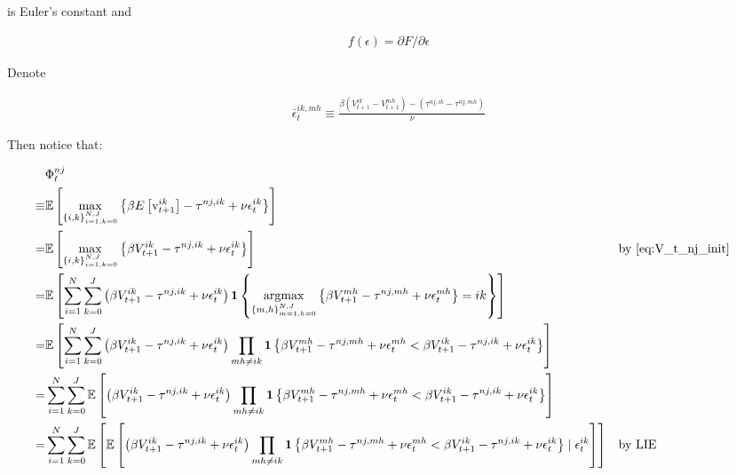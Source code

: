 \documentclass[10pt]{article}
\begin{document}
is Euler's constant and 

\begin{align}
    f(\epsilon)=\partial F / \partial \epsilon
\end{align}

Denote

\begin{align}
    \bar{\epsilon}_t^{i k, m h} \equiv \frac{\beta\left(V_{t+1}^{i k}-V_{t+1}^{m h}\right)-\left(\tau^{n j, i k}-\tau^{n j, m h}\right)}{\nu} \label{eq:bar_epsilon_exp}
\end{align}

Then notice that:

\begin{align}
    &\Phi_t^{n j} \\
    \equiv &\mathbb{E}\left[\max _{\{i, k\}_{i=1, k=0}^{N, J}}\left\{\beta E\left[\mathrm{v}_{t+1}^{i k}\right]-\tau^{n j, i k}+\nu \epsilon_t^{i k}\right\}\right] \\
    = &\mathbb{E}\left[\max _{\{i, k\}_{i=1, k=0}^{N, J}} \left\{ \beta V_{t+1}^{i k}-\tau^{n j, i k}+\nu \epsilon_t^{i k} \right\}\right] && \text{by \eqref{eq:V_t_nj_init}} \\
    = &\mathbb{E}\left[ \sum_{i = 1}^N \sum_{k = 0}^J \left(\beta V_{t+1}^{i k}-\tau^{n j, i k}+\nu \epsilon_t^{i k}\right) \mathbf{1}\left\{ \underset{{\{m, h\}_{m=1, h=0}^{N, J}}}{\text{argmax}} \left\{ \beta V_{t+1}^{m h}-\tau^{n j, m h}+\nu \epsilon_t^{m h} \right\} = i k \right\} \right] \\
    = &\mathbb{E}\left[ \sum_{i = 1}^N \sum_{k = 0}^J \left(\beta V_{t+1}^{i k}-\tau^{n j, i k}+\nu \epsilon_t^{i k}\right) \prod_{m h \neq i k} \mathbf{1}\left\{ \beta V_{t+1}^{m h}-\tau^{n j, m h}+\nu \epsilon_t^{m h} < \beta V_{t+1}^{i k}-\tau^{n j, i k}+\nu \epsilon_t^{i k} \right\} \right] \\
    = &\sum_{i=1}^N \sum_{k=0}^J \mathbb{E}\left[ \left(\beta V_{t+1}^{i k}-\tau^{n j, i k}+\nu \epsilon_t^{i k}\right) \prod_{m h \neq i k} \mathbf{1}\left\{ \beta V_{t+1}^{m h}-\tau^{n j, m h}+\nu \epsilon_t^{m h} < \beta V_{t+1}^{i k}-\tau^{n j, i k}+\nu \epsilon_t^{i k} \right\} \right] \\
    = &\sum_{i=1}^N \sum_{k=0}^J \mathbb{E}\left[ \mathbb{E} \left[ \left(\beta V_{t+1}^{i k}-\tau^{n j, i k}+\nu \epsilon_t^{i k}\right) \prod_{m h \neq i k} \mathbf{1}\left\{ \beta V_{t+1}^{m h}-\tau^{n j, m h}+\nu \epsilon_t^{m h} < \beta V_{t+1}^{i k}-\tau^{n j, i k}+\nu \epsilon_t^{i k} \right\} \mid \epsilon_t^{i k} \right] \right] && \text{by LIE} \\

\end{align}
\end{document}

